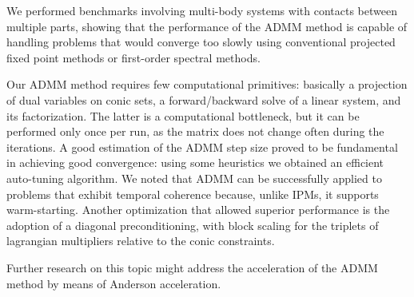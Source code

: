 \documentclass[AMA,STIX1COL]{WileyNJD-v2}
\begin{document}
We performed benchmarks involving multi-body systems with contacts between multiple parts, showing that the performance of the ADMM method is capable of handling problems that would converge too slowly using conventional projected fixed point methods or first-order spectral methods.

Our ADMM method requires few computational primitives: basically a projection of dual variables on conic sets, a forward/backward solve of a linear system, and its factorization. The latter is a computational bottleneck, but it can be performed only once per run, as the matrix does not change often during the iterations. 
A good estimation of the ADMM step size proved to be fundamental in achieving good convergence: using some heuristics we obtained an efficient auto-tuning algorithm. 
We noted that ADMM can be successfully applied to problems that exhibit temporal coherence because, unlike IPMs, it supports warm-starting. 
Another optimization that allowed superior performance is the adoption of a diagonal preconditioning, with block scaling for the triplets of lagrangian multipliers relative to the conic constraints.

Further research on this topic might address the acceleration of the ADMM method by means of Anderson acceleration.


%

\end{document}
